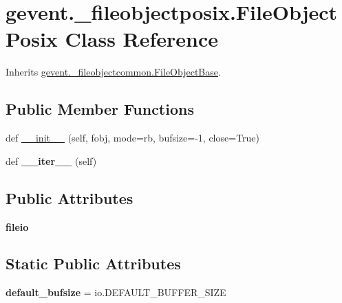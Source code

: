 \hypertarget{classgevent_1_1__fileobjectposix_1_1_file_object_posix}{}\section{gevent.\+\_\+fileobjectposix.\+File\+Object\+Posix Class Reference}
\label{classgevent_1_1__fileobjectposix_1_1_file_object_posix}


Inherits \hyperlink{classgevent_1_1__fileobjectcommon_1_1_file_object_base}{gevent.\+\_\+fileobjectcommon.\+File\+Object\+Base}.

\subsection*{Public Member Functions}
\begin{DoxyCompactItemize}
\item 
def \hyperlink{classgevent_1_1__fileobjectposix_1_1_file_object_posix_a349d8eb16287677be25306052b1efae9}{\+\_\+\+\_\+init\+\_\+\+\_\+} (self, fobj, mode=\textquotesingle{}rb\textquotesingle{}, bufsize=-\/1, close=True)
\item 
\mbox{\label{classgevent_1_1__fileobjectposix_1_1_file_object_posix_abb08a99de17fcb8a04d8bd701fb775d5}} 
def {\bfseries \+\_\+\+\_\+iter\+\_\+\+\_\+} (self)
\end{DoxyCompactItemize}
\subsection*{Public Attributes}
\begin{DoxyCompactItemize}
\item 
\mbox{\label{classgevent_1_1__fileobjectposix_1_1_file_object_posix_a557ae9bfd4660e19ac385df8cba20f34}} 
{\bfseries fileio}
\end{DoxyCompactItemize}
\subsection*{Static Public Attributes}
\begin{DoxyCompactItemize}
\item 
\mbox{\label{classgevent_1_1__fileobjectposix_1_1_file_object_posix_a305f0535716af6fa7fd6b6f73230b583}} 
{\bfseries default\+\_\+bufsize} = io.\+D\+E\+F\+A\+U\+L\+T\+\_\+\+B\+U\+F\+F\+E\+R\+\_\+\+S\+I\+ZE
\end{DoxyCompactItemize}


